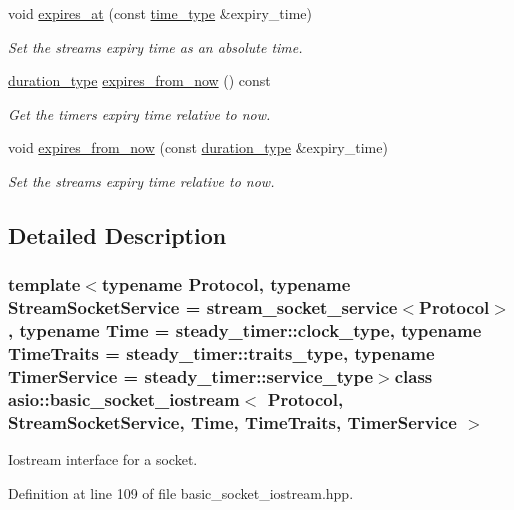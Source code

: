 \begin{DoxyCompactItemize}
void \hyperlink{classasio_1_1basic__socket__iostream_ae2eb6f8084ea7d562e24befd4b7ba656}{expires\+\_\+at} (const \hyperlink{classasio_1_1basic__socket__iostream_a1f1cbdf5a23170d9d7b4a03f4dcf1a03}{time\+\_\+type} \&expiry\+\_\+time)
\begin{DoxyCompactList}\small\item\em Set the stream\textquotesingle{}s expiry time as an absolute time. \end{DoxyCompactList}\item 
\hyperlink{classasio_1_1basic__socket__iostream_af9d3e684e0709c574a1d92f7013e1b36}{duration\+\_\+type} \hyperlink{classasio_1_1basic__socket__iostream_ad78a7d7a6b6b51418334ba935cd03424}{expires\+\_\+from\+\_\+now} () const 
\begin{DoxyCompactList}\small\item\em Get the timer\textquotesingle{}s expiry time relative to now. \end{DoxyCompactList}\item 
void \hyperlink{classasio_1_1basic__socket__iostream_af22475f50cdfceeb61856fcfd9324d20}{expires\+\_\+from\+\_\+now} (const \hyperlink{classasio_1_1basic__socket__iostream_af9d3e684e0709c574a1d92f7013e1b36}{duration\+\_\+type} \&expiry\+\_\+time)
\begin{DoxyCompactList}\small\item\em Set the stream\textquotesingle{}s expiry time relative to now. \end{DoxyCompactList}\end{DoxyCompactItemize}


\subsection{Detailed Description}
\subsubsection*{template$<$typename Protocol, typename Stream\+Socket\+Service = stream\+\_\+socket\+\_\+service$<$\+Protocol$>$, typename Time = steady\+\_\+timer\+::clock\+\_\+type, typename Time\+Traits = steady\+\_\+timer\+::traits\+\_\+type, typename Timer\+Service = steady\+\_\+timer\+::service\+\_\+type$>$class asio\+::basic\+\_\+socket\+\_\+iostream$<$ Protocol, Stream\+Socket\+Service, Time, Time\+Traits, Timer\+Service $>$}

Iostream interface for a socket. 

Definition at line 109 of file basic\+\_\+socket\+\_\+iostream.\+hpp.



